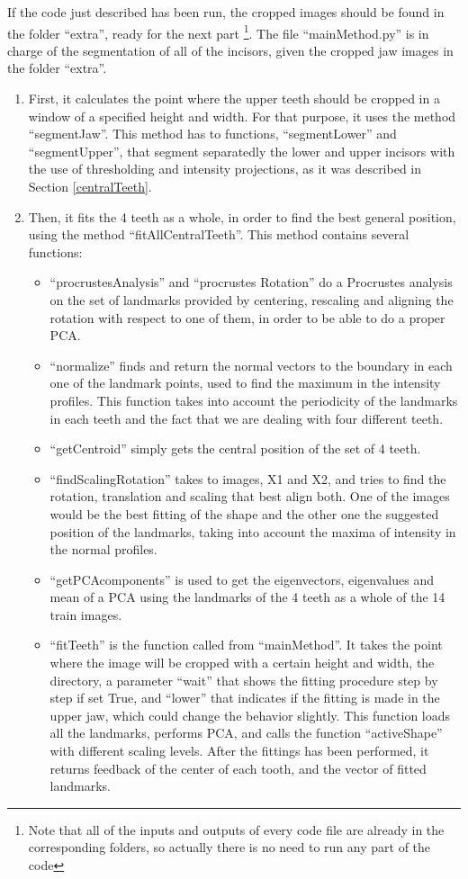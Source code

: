 \documentclass[a4paper,11pt,twoside]{article}
\begin{document}
If the code just described has been run, the cropped images should be found in the folder ``extra'', ready for the next part \footnote{Note that all of the inputs and outputs of every code file are already in the corresponding folders, so actually there is no need to run any part of the code}. The file ``mainMethod.py'' is in charge of the segmentation of all of the incisors, given the cropped jaw images in the folder ``extra''. 

\begin{enumerate}

\item First, it calculates the point where the upper teeth should be cropped in a window of a specified height and width. For that purpose, it uses the method ``segmentJaw''. This method has to functions, ``segmentLower'' and ``segmentUpper'', that segment separatedly the lower and upper incisors with the use of thresholding and intensity projections, as it was described in Section \textsection\ref{centralTeeth}.
\item Then, it fits the 4 teeth as a whole, in order to find the best general position, using the method ``fitAllCentralTeeth''. This method contains several functions:
\begin{itemize}
\item ``procrustesAnalysis'' and ``procrustes Rotation'' do a Procrustes analysis on the set of landmarks provided by centering, rescaling and aligning the rotation with respect to one of them, in order to be able to do a proper PCA.
\item ``normalize'' finds and return the normal vectors to the boundary in each one of the landmark points, used to find the maximum in the intensity profiles. This function takes into account the periodicity of the landmarks in each teeth and the fact that we are dealing with four different teeth.
\item ``getCentroid'' simply gets the central position of the set of 4 teeth.
\item ``findScalingRotation'' takes to images, X1 and X2, and tries to find the rotation, translation and scaling that best align both. One of the images would be the best fitting of the shape and the other one the suggested position of the landmarks, taking into account the maxima of intensity in the normal profiles.
\item ``getPCAcomponents'' is used to get the eigenvectors, eigenvalues and mean of a PCA using the landmarks of the 4 teeth as a whole of the 14 train images.
\item ``fitTeeth'' is the function called from ``mainMethod''. It takes the point where the image will be cropped with a certain height and width, the directory, a parameter ``wait'' that shows the fitting procedure step by step if set True, and ``lower'' that indicates if the fitting is made in the upper jaw, which could change the behavior slightly. This function loads all the landmarks, performs PCA, and calls the function ``activeShape'' with different scaling levels. After the fittings has been performed, it returns feedback of the center of each tooth, and the vector of fitted landmarks.

\end{itemize}
\end{enumerate}
\end{document}
